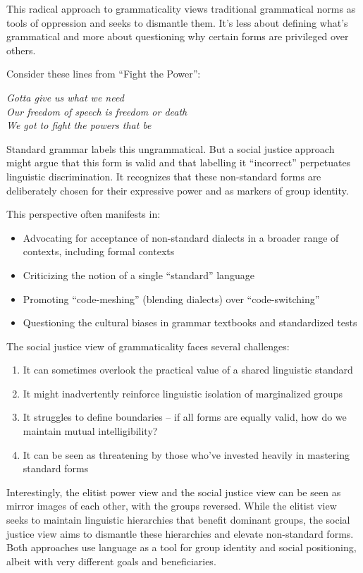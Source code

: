 This radical approach to grammaticality views traditional grammatical norms as tools of oppression and seeks to dismantle them. It's less about defining what's grammatical and more about questioning why certain forms are privileged over others.

Consider these lines from ``Fight the Power'':

\ea
\textit{Gotta give us what we need\\
Our freedom of speech is freedom or death\\
We got to fight the powers that be}
\z

Standard grammar labels this ungrammatical. But a social justice approach might argue that this form is valid and that labelling it ``incorrect'' perpetuates linguistic discrimination. It recognizes that these non-standard forms are deliberately chosen for their expressive power and as markers of group identity.

This perspective often manifests in:

\begin{itemize}
    \item Advocating for acceptance of non-standard dialects in a broader range of contexts, including formal contexts
    \item Criticizing the notion of a single ``standard'' language
    \item Promoting ``code-meshing'' (blending dialects) over ``code-switching''
    \item Questioning the cultural biases in grammar textbooks and standardized tests
\end{itemize}

The social justice view of grammaticality faces several challenges:

\begin{enumerate}
    \item It can sometimes overlook the practical value of a shared linguistic standard
    \item It might inadvertently reinforce linguistic isolation of marginalized groups
    \item It struggles to define boundaries -- if all forms are equally valid, how do we maintain mutual intelligibility?
    \item It can be seen as threatening by those who've invested heavily in mastering standard forms
\end{enumerate}

Interestingly, the elitist power view and the social justice view can be seen as mirror images of each other, with the groups reversed. While the elitist view seeks to maintain linguistic hierarchies that benefit dominant groups, the social justice view aims to dismantle these hierarchies and elevate non-standard forms. Both approaches use language as a tool for group identity and social positioning, albeit with very different goals and beneficiaries.

